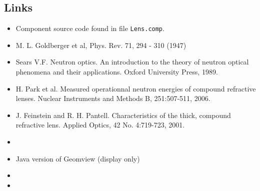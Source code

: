 \subsection*{Links}
\begin{itemize}
  \item Component source code found in file \texttt{Lens.comp}.
  \item M. L. Goldberger et al, Phys. Rev. 71, 294 - 310 (1947)
  \item Sears V.F. Neutron optics. An introduction to the theory of neutron optical phenomena and their applications. Oxford University Press, 1989.
  \item H. Park et al. Measured operationnal neutron energies of compound refractive lenses. Nuclear Instruments and Methods B, 251:507-511, 2006.
  \item J. Feinstein and R. H. Pantell. Characteristics of the thick, compound refractive lens. Applied Optics, 42 No. 4:719-723, 2001.
  \item {}
  \item Java version of Geomview (display only) 
  \item {}
  \item {}
\end{itemize}
